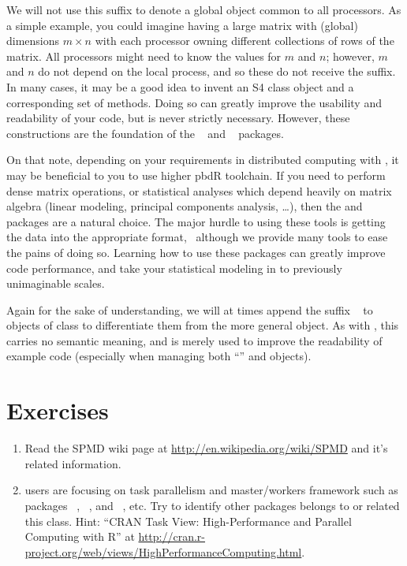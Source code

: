 We will not use this suffix to denote a global object common to all processors.  As a simple example, you could imagine having a large matrix with (global) dimensions $m\times n$ with each processor owning different collections of rows of the matrix.  All processors might need to know the values for $m$ and $n$; however, $m$ and $n$ do not depend on the local process, and so these do not receive the  suffix.  In many cases, it may be a good idea to invent an S4 class object and a corresponding set of methods.  Doing so can greatly improve the usability and readability of your code, but is never strictly necessary.  However, these constructions are the foundation of the ~\citep{Schmidt2012pbdBASEpackage} and
~\citep{Schmidt2012pbdDMATpackage} packages.

On that note, depending on your requirements in distributed computing with , it may be beneficial to you to use higher pbdR toolchain.  If you need to perform dense matrix operations, or statistical analyses which depend heavily on matrix algebra (linear modeling, principal components analysis, \dots), then the  and  packages are a natural choice.  The major hurdle to using these tools is getting the data into the appropriate  format,~ although we provide many tools to ease the pains of doing so.  Learning how to use these packages can greatly improve code performance, and take your statistical modeling in  to previously unimaginable scales.

Again for the sake of understanding, we will at times append the suffix ~ to objects of class  to differentiate them from the more general  object.  As with , this carries no semantic meaning, and is merely used to improve the readability of example code (especially when managing both ``'' and  objects).




\section{Exercises}
\label{sec:background}

\begin{enumerate}[label=\thechapter-\arabic*]
\item
Read the SPMD wiki page at
\url{http://en.wikipedia.org/wiki/SPMD}
and it's related information.

\item
{} users are focusing on task parallelism and master/workers
framework such as packages
~\citep{Tierney2012},
~\citep{parallel}, and
~\citep{rmpi}, etc.
Try to identify other packages belongs to or related this class.
{\color{blue}Hint:
``CRAN Task View: High-Performance and Parallel Computing with R'' at
\url{http://cran.r-project.org/web/views/HighPerformanceComputing.html}.
}

\end{enumerate}

